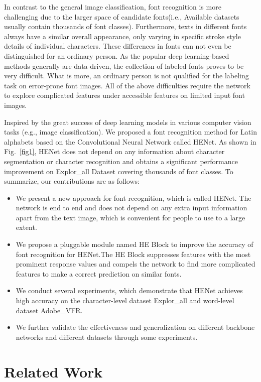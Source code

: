 \documentclass[manuscript,screen]{acmart}
\begin{document}
In contrast to the general image classification, font recognition is more challenging due to the larger space of candidate fonts(i.e., Available datasets usually contain thousands of font classes). Furthermore, texts in different fonts always have a similar overall appearance, only varying in specific stroke style details of individual characters. These differences in fonts can not even be distinguished for an ordinary person. As the popular deep learning-based methods generally are data-driven, the collection of labeled fonts proves to be very difficult. What is more, an ordinary person is not qualified for the labeling task on error-prone font images. All of the above difficulties require the network to explore complicated features under accessible features on limited input font images.  

Inspired by the great success of deep learning models in various computer vision tasks (e.g., image classification). We proposed a font recognition method for Latin alphabets based on the Convolutional Neural Network called HENet.  As shown in Fig.~\ref{fig1}, HENet does not depend on any information about character segmentation or character recognition and obtains a significant performance improvement on Explor\_all Dataset covering thousands of font classes. To summarize, our contributions are as follows:

\begin{itemize}
\item We present a new approach for font recognition, which is called HENet. The network is end to end and does not depend on any extra input information apart from the text image, which is convenient for people to use to a large extent.
\item We propose a pluggable module named HE Block to improve the accuracy of font recognition for HENet.The HE Block suppresses features with the most prominent response values and compels the network to find more complicated features to make a correct prediction on similar fonts. 
\item We conduct several experiments, which demonstrate that HENet achieves high accuracy on the character-level dataset Explor\_all and word-level dataset Adobe\_VFR.
\item We further validate the effectiveness and generalization on different backbone networks and different datasets through some experiments.
\end{itemize}



\section{Related Work}
\end{document}
